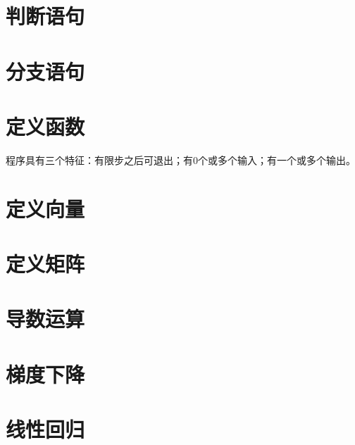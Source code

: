 \section{判断语句}

\section{分支语句}

\section{定义函数}
程序具有三个特征：有限步之后可退出；有0个或多个输入；有一个或多个输出。


\section{定义向量}

\section{定义矩阵}

\section{导数运算}

\section{梯度下降}

\section{线性回归}
